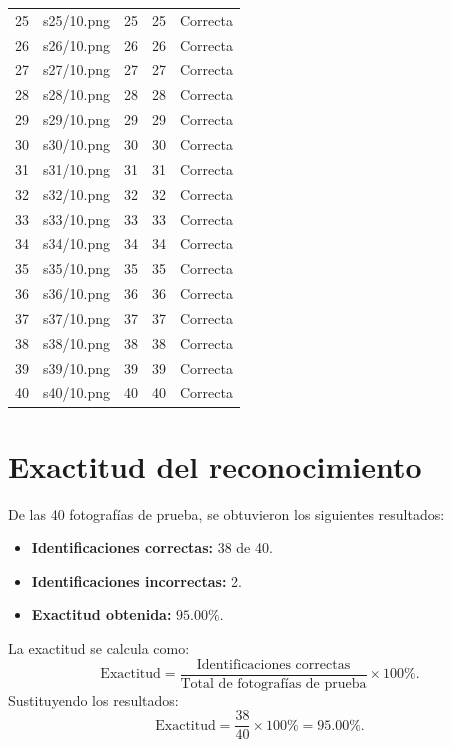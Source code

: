 \documentclass[12pt, letterpaper]{article}
\begin{document}
\begin{longtable}{c c c c c}
    25 & s25/10.png & 25 & 25 & Correcta \\
    26 & s26/10.png & 26 & 26 & Correcta \\
    27 & s27/10.png & 27 & 27 & Correcta \\
    28 & s28/10.png & 28 & 28 & Correcta \\
    29 & s29/10.png & 29 & 29 & Correcta \\
    30 & s30/10.png & 30 & 30 & Correcta \\
    31 & s31/10.png & 31 & 31 & Correcta \\
    32 & s32/10.png & 32 & 32 & Correcta \\
    33 & s33/10.png & 33 & 33 & Correcta \\
    34 & s34/10.png & 34 & 34 & Correcta \\
    35 & s35/10.png & 35 & 35 & Correcta \\
    36 & s36/10.png & 36 & 36 & Correcta \\
    37 & s37/10.png & 37 & 37 & Correcta \\
    38 & s38/10.png & 38 & 38 & Correcta \\
    39 & s39/10.png & 39 & 39 & Correcta \\
    40 & s40/10.png & 40 & 40 & Correcta \\
\end{longtable}

\section{Exactitud del reconocimiento}

De las 40 fotografías de prueba, se obtuvieron los siguientes
resultados:

\begin{itemize}
    \item \textbf{Identificaciones correctas:} 38 de 40.
    \item \textbf{Identificaciones incorrectas:} 2.
    \item \textbf{Exactitud obtenida:} $95.00\%$.
\end{itemize}

La exactitud se calcula como:
\[
    \text{Exactitud} =
    \frac{\text{Identificaciones correctas}}
         {\text{Total de fotografías de prueba}} \times 100\%.
\]
Sustituyendo los resultados:
\[
    \text{Exactitud} = \frac{38}{40} \times 100\% = 95.00\%.
\]
\end{document}
